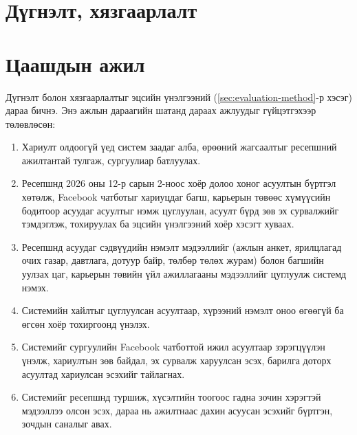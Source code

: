 \iffull
\chapter{Дүгнэлт, хязгаарлалт}
\else
\chapter{Цаашдын ажил}
\fi
\label{ch:conclusion}



Дүгнэлт болон хязгаарлалтыг эцсийн үнэлгээний (\ref{sec:evaluation-method}-р хэсэг) дараа бичнэ. Энэ ажлын дараагийн шатанд дараах ажлуудыг гүйцэтгэхээр төлөвлөсөн:
\begin{enumerate}
    \item Хариулт олдоогүй үед систем заадаг алба, өрөөний жагсаалтыг ресепшний ажилтантай тулгаж, сургуулиар батлуулах.
    \item Ресепшнд 2026 оны 12-р сарын 2-ноос хоёр долоо хоног асуултын бүртгэл хөтөлж, Facebook чатботыг хариуцдаг багш, карьерын төвөөс хүмүүсийн бодитоор асуудаг асуултыг нэмж цуглуулан, асуулт бүрд зөв эх сурвалжийг тэмдэглэж, тохируулах ба эцсийн үнэлгээний хоёр хэсэгт хуваах.
    \item Ресепшнд асуудаг сэдвүүдийн нэмэлт мэдээллийг (ажлын анкет, ярилцлагад очих газар, давтлага, дотуур байр, төлбөр төлөх журам) болон багшийн уулзах цаг, карьерын төвийн үйл ажиллагааны мэдээллийг цуглуулж системд нэмэх.
    \item Системийн хайлтыг цуглуулсан асуултаар, хүрээний нэмэлт оноо өгөөгүй ба өгсөн хоёр тохиргоонд үнэлэх.
    \item Системийг сургуулийн Facebook чатботтой ижил асуултаар зэрэгцүүлэн үнэлж, хариултын зөв байдал, эх сурвалж харуулсан эсэх, барилга доторх асуултад хариулсан эсэхийг тайлагнах.
    \item Системийг ресепшнд туршиж, хүсэлтийн тоогоос гадна зочин хэрэгтэй мэдээллээ олсон эсэх, дараа нь ажилтнаас дахин асуусан эсэхийг бүртгэн, зочдын саналыг авах.
\end{enumerate}
